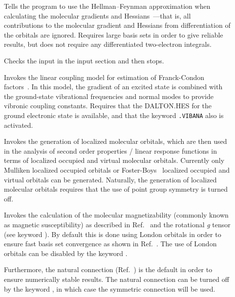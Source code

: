 \begin{description}
\item[]
Tells the program to use the Hellman--Feynman approximation when
calculating the molecular gradients and
Hessians~\cite{hhbook,rpfpr56,vbthwkkrmp96}---that is, all
contributions to the molecular gradient and Hessians from
differentiation of the orbitals are ignored. Requires large basis sets
in order to give reliable results, but does not require any
differentiated two-electron integrals.

%

\item[] Checks the input in the  input
  section and then stops.


\item[] Invokes the linear coupling model for estimation
of Franck-Condon factors~\cite{optphavckrcp260}. In this model, the
gradient of an excited state is combined with the ground-state
vibrational frequencies and normal modes to provide vibronic coupling
constants. Requires that the DALTON.HES for the ground electronic
state is available, and that the keyword \verb|.VIBANA| also is
activated.

\item[] Invokes the generation of localized molecular
orbitals, which are then used in the analysis of second order
properties / linear response functions in terms of localized occupied
and virtual molecular orbitals. Currently only Mulliken localized
occupied orbitals or Foster-Boys~\cite{Boyloc} localized occupied and
virtual orbitals can be generated. Naturally, the generation of
localized molecular orbitals requires that the use of point group
symmetry is turned off.


\item[] Invokes the calculation of the molecular
magnetizability (commonly known as magnetic
susceptibility) as
described in Ref.~\cite{krthklbpjhjajjcp99} and the rotational {\em g}
tensor (see keyword ).  By
default this is done
using London orbitals in order to
ensure fast basis set convergence as shown in
Ref.~\cite{krthklbpjhjajjcp99}. The use of London
orbitals can be disabled by the keyword .

Furthermore, the natural connection
(Ref.~\cite{joklbkrthpjtca90,krthjopjklbcpl235}) is the default in order to ensure
numerically stable results. The natural
connection can be turned off by the keyword , in which case
the symmetric connection will be used.


\end{description}
